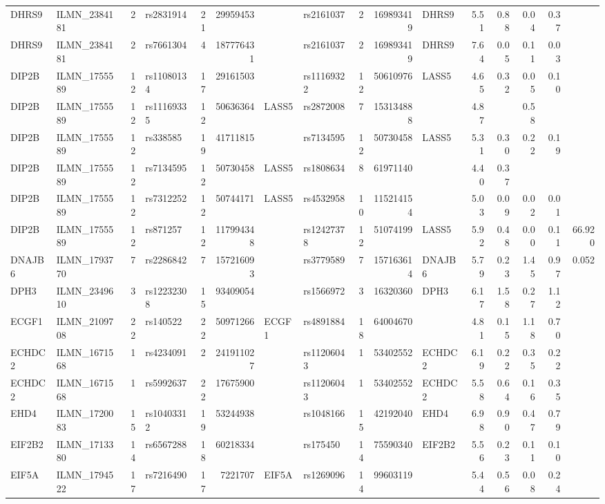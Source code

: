 \documentclass{article}
\begin{document}
\begin{landscape}
{\begin{ThreePartTable}
\begin{longtable}{|llr|lrrl|lrrl|rrrr|r|}
  DHRS9 & ILMN\_2384181 & 2 & rs2831914 & 21 & 29959453 &  & rs2161037 & 2 & 169893419 & DHRS9 & 5.51 & 0.88 & 0.04 & 0.37 &  \\
  DHRS9 & ILMN\_2384181 & 2 & rs7661304 & 4 & 187776431 &  & rs2161037 & 2 & 169893419 & DHRS9 & 7.64 & 0.05 & 0.11 & 0.03 &  \\
  DIP2B & ILMN\_1755589 & 12 & rs11080134 & 17 & 29161503 &  & rs11169322 & 12 & 50610976 & LASS5 & 4.65 & 0.32 & 0.05 & 0.10 &  \\
  DIP2B & ILMN\_1755589 & 12 & rs11169335 & 12 & 50636364 & LASS5 & rs2872008 & 7 & 153134888 &  & 4.87 &  & 0.58 &  &  \\
  DIP2B & ILMN\_1755589 & 12 & rs338585 & 19 & 41711815 &  & rs7134595 & 12 & 50730458 & LASS5 & 5.31 & 0.30 & 0.22 & 0.19 &  \\
  DIP2B & ILMN\_1755589 & 12 & rs7134595 & 12 & 50730458 & LASS5 & rs1808634 & 8 & 61971140 &  & 4.40 & 0.37 &  &  &  \\
  DIP2B & ILMN\_1755589 & 12 & rs7312252 & 12 & 50744171 & LASS5 & rs4532958 & 10 & 115214154 &  & 5.03 & 0.09 & 0.02 & 0.01 &  \\
  DIP2B & ILMN\_1755589 & 12 & rs871257 & 12 & 117994348 &  & rs12427378 & 12 & 51074199 & LASS5 & 5.92 & 0.48 & 0.00 & 0.11 & 66.920 \\
  DNAJB6 & ILMN\_1793770 & 7 & rs2286842 & 7 & 157216093 &  & rs3779589 & 7 & 157163614 & DNAJB6 & 5.79 & 0.23 & 1.45 & 0.97 & 0.052 \\
  DPH3 & ILMN\_2349610 & 3 & rs12232308 & 15 & 93409054 &  & rs1566972 & 3 & 16320360 & DPH3 & 6.17 & 1.58 & 0.27 & 1.12 &  \\
  ECGF1 & ILMN\_2109708 & 22 & rs140522 & 22 & 50971266 & ECGF1 & rs4891884 & 18 & 64004670 &  & 4.81 & 0.15 & 1.18 & 0.70 &  \\
  ECHDC2 & ILMN\_1671568 & 1 & rs4234091 & 2 & 241911027 &  & rs11206043 & 1 & 53402552 & ECHDC2 & 6.19 & 0.22 & 0.35 & 0.22 &  \\
  ECHDC2 & ILMN\_1671568 & 1 & rs5992637 & 22 & 17675900 &  & rs11206043 & 1 & 53402552 & ECHDC2 & 5.58 & 0.64 & 0.16 & 0.35 &  \\
  EHD4 & ILMN\_1720083 & 15 & rs10403312 & 19 & 53244938 &  & rs1048166 & 15 & 42192040 & EHD4 & 6.98 & 0.90 & 0.47 & 0.79 &  \\
  EIF2B2 & ILMN\_1713380 & 14 & rs6567288 & 18 & 60218334 &  & rs175450 & 14 & 75590340 & EIF2B2 & 5.56 & 0.23 & 0.11 & 0.10 &  \\
  EIF5A & ILMN\_1794522 & 17 & rs7216490 & 17 & 7221707 & EIF5A & rs1269096 & 14 & 99603119 &  & 5.44 & 0.56 & 0.08 & 0.24 &  \\

\end{longtable}
\end{ThreePartTable}}
\end{landscape}
\end{document}
